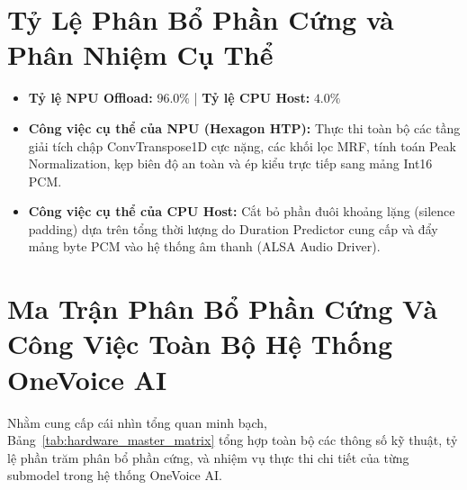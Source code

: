 \documentclass[11pt,a4paper,oneside,table]{report}
\begin{document}
\section{Tỷ Lệ Phân Bổ Phần Cứng và Phân Nhiệm Cụ Thể}
\begin{itemize}
    \item \textbf{Tỷ lệ NPU Offload:} $\mathbf{96.0\%}$ | \textbf{Tỷ lệ CPU Host:} $\mathbf{4.0\%}$
    \item \textbf{Công việc cụ thể của NPU (Hexagon HTP):} Thực thi toàn bộ các tầng giải tích chập ConvTranspose1D cực nặng, các khối lọc MRF, tính toán Peak Normalization, kẹp biên độ an toàn và ép kiểu trực tiếp sang mảng Int16 PCM.
    \item \textbf{Công việc cụ thể của CPU Host:} Cắt bỏ phần đuôi khoảng lặng (silence padding) dựa trên tổng thời lượng do Duration Predictor cung cấp và đẩy mảng byte PCM vào hệ thống âm thanh (ALSA Audio Driver).
\end{itemize}

\section{Ma Trận Phân Bổ Phần Cứng Và Công Việc Toàn Bộ Hệ Thống OneVoice AI}
\label{sec:system_allocation_matrix}

Nhằm cung cấp cái nhìn tổng quan minh bạch, Bảng~\ref{tab:hardware_master_matrix} tổng hợp toàn bộ các thông số kỹ thuật, tỷ lệ phần trăm phân bổ phần cứng, và nhiệm vụ thực thi chi tiết của từng submodel trong hệ thống OneVoice AI.
\end{document}
